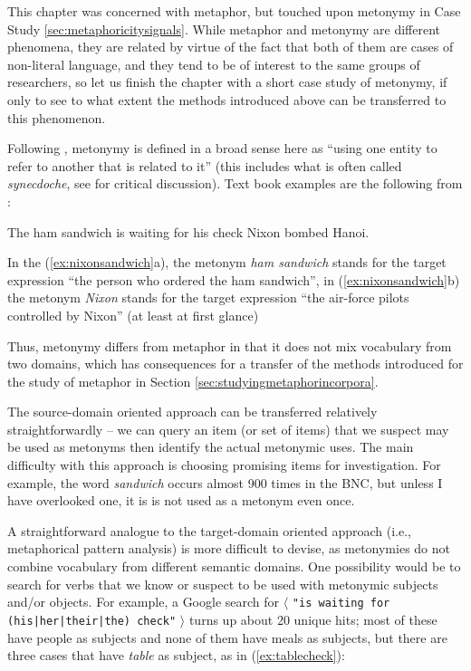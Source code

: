 This chapter was concerned with metaphor, but touched upon metonymy in Case Study \ref{sec:metaphoricitysignals}. While metaphor and metonymy are different phenomena, they are related by virtue of the fact that both of them are cases of non-literal language, and they tend to be of interest to the same groups of researchers, so let us finish the chapter with a short case study of metonymy, if only to see to what extent the methods introduced above can be transferred to this phenomenon.

Following \citet[35]{lakoff_metaphors_1980}, metonymy is defined in a broad sense here as ``using one entity to refer to another that is related to it'' (this includes what is often called \textit{synecdoche}, see \citet{panther_distinguishing_1999} for critical discussion). Text book examples are the following from \citep[35, 39]{lakoff_metaphors_1980}:

\begin{exe}
\ex
\begin{xlist} 
\label{ex:nixonsandwich}
\ex The ham sandwich is waiting for his check
\ex Nixon bombed Hanoi.
\end{xlist}
\end{exe}

In the (\ref{ex:nixonsandwich}a), the metonym \textit{ham sandwich} stands for the target expression ``the person who ordered the ham sandwich'', in (\ref{ex:nixonsandwich}b) the metonym \textit{Nixon} stands for the target expression ``the air-force pilots controlled by Nixon'' (at least at first glance)

Thus, metonymy differs from metaphor in that it does not mix vocabulary from two domains, which has consequences for a transfer of the methods introduced for the study of metaphor in Section \ref{sec:studyingmetaphorincorpora}.

The source-domain oriented approach can be transferred relatively straightforwardly -- we can query an item (or set of items) that we suspect may be used as metonyms then identify the actual metonymic uses. The main difficulty with this approach is choosing promising items for investigation. For example, the word \textit{sandwich} occurs almost 900 times in the BNC, but unless I have overlooked one, it is is not used as a metonym even once.

A straightforward analogue to the target-domain oriented approach (i.e., metaphorical pattern analysis) is more difficult to devise, as metonymies do not combine vocabulary from different semantic domains. One possibility would be to search for verbs that we know or suspect to be used with metonymic subjects and/or objects. For example, a Google search for $\langle$ \texttt{"is waiting for (his|her|their|the) check"} $\rangle$ turns up about 20 unique hits; most of these have people as subjects and none of them have meals as subjects, but there are three cases that have \textit{table} as subject, as in (\ref{ex:tablecheck}):

